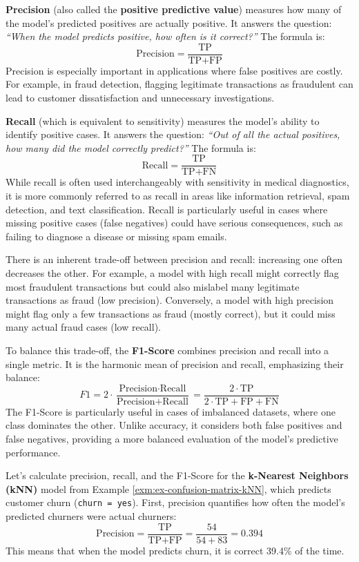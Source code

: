 \documentclass[
]{book}
\newcommand{\passthrough}[1]{#1}
\theoremstyle{definition}
\theoremstyle{definition}
\theoremstyle{definition}
\theoremstyle{definition}
\theoremstyle{remark}
\begin{document}
\textbf{Precision} (also called the \textbf{positive predictive value}) measures how many of the model's predicted positives are actually positive. It answers the question: \emph{``When the model predicts positive, how often is it correct?''} The formula is:\\
\[
\text{Precision} = \frac{\text{TP}}{\text{TP} + \text{FP}}
\]
Precision is especially important in applications where false positives are costly. For example, in fraud detection, flagging legitimate transactions as fraudulent can lead to customer dissatisfaction and unnecessary investigations.

\textbf{Recall} (which is equivalent to sensitivity) measures the model's ability to identify positive cases. It answers the question: \emph{``Out of all the actual positives, how many did the model correctly predict?''} The formula is:\\
\[
\text{Recall} = \frac{\text{TP}}{\text{TP} + \text{FN}}
\]
While recall is often used interchangeably with sensitivity in medical diagnostics, it is more commonly referred to as recall in areas like information retrieval, spam detection, and text classification. Recall is particularly useful in cases where missing positive cases (false negatives) could have serious consequences, such as failing to diagnose a disease or missing spam emails.

There is an inherent trade-off between precision and recall: increasing one often decreases the other. For example, a model with high recall might correctly flag most fraudulent transactions but could also mislabel many legitimate transactions as fraud (low precision). Conversely, a model with high precision might flag only a few transactions as fraud (mostly correct), but it could miss many actual fraud cases (low recall).

To balance this trade-off, the \textbf{F1-Score} combines precision and recall into a single metric. It is the harmonic mean of precision and recall, emphasizing their balance:\\
\[
F1 = 2 \cdot \frac{\text{Precision} \cdot \text{Recall}}{\text{Precision} + \text{Recall}} 
   = \frac{2 \cdot \text{TP}}{2 \cdot \text{TP} + \text{FP} + \text{FN}}
\]
The F1-Score is particularly useful in cases of imbalanced datasets, where one class dominates the other. Unlike accuracy, it considers both false positives and false negatives, providing a more balanced evaluation of the model's predictive performance.

Let's calculate precision, recall, and the F1-Score for the \textbf{k-Nearest Neighbors (kNN)} model from Example \ref{exm:ex-confusion-matrix-kNN}, which predicts customer churn (\passthrough{\lstinline!churn = yes!}). First, precision quantifies how often the model's predicted churners were actual churners:
\[
\text{Precision} = \frac{\text{TP}}{\text{TP} + \text{FP}} = \frac{54}{54 + 83} = 0.394
\]
This means that when the model predicts churn, it is correct 39.4\% of the time.
\end{document}
